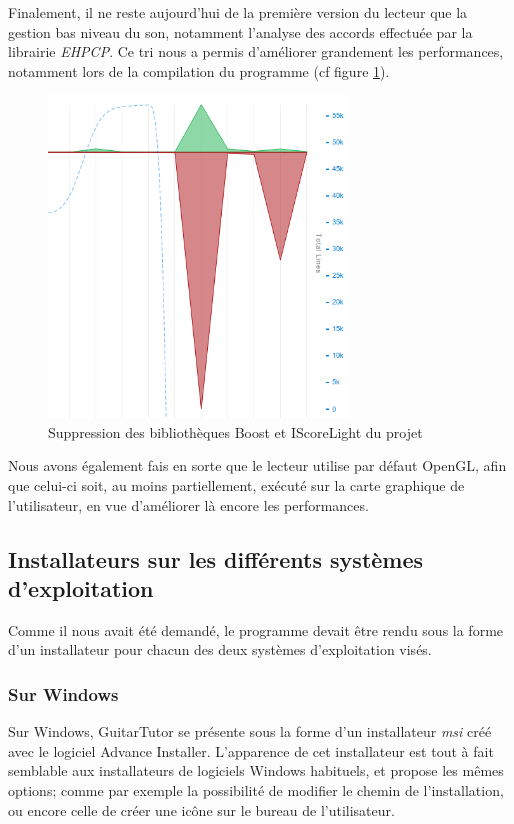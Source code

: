 \documentclass[a4paper,11pt]{article}
\begin{document}
Finalement, il ne reste aujourd'hui de la première version du lecteur que la gestion bas niveau du son, notamment l'analyse des accords effectuée par la librairie \textit{EHPCP}. Ce tri nous a permis d'améliorer grandement les performances, notamment lors de la compilation du programme (cf figure \ref{refonte_code}).

\begin{figure}[H]
\begin{center}
\includegraphics[width=300px]{refonte_code.png}
\caption{Suppression des bibliothèques Boost et IScoreLight du projet}
\label{refonte_code}
\end{center}
\end{figure}

Nous avons également fais en sorte que le lecteur utilise par défaut OpenGL, afin que celui-ci soit, au moins partiellement, exécuté sur la carte graphique de l'utilisateur, en vue d'améliorer là encore les performances.

\subsection{Installateurs sur les différents systèmes d'exploitation}

Comme il nous avait été demandé, le programme devait être rendu sous la forme d'un installateur pour chacun des deux systèmes d'exploitation visés.

\subsubsection{Sur Windows}

Sur Windows, GuitarTutor se présente sous la forme d'un installateur \textit{msi} créé avec le logiciel Advance Installer. L'apparence de cet installateur est tout à fait semblable aux installateurs de logiciels Windows habituels, et propose les mêmes options; comme par exemple la possibilité de modifier le chemin de l'installation, ou encore celle de créer une icône sur le bureau de l'utilisateur.
\end{document}
